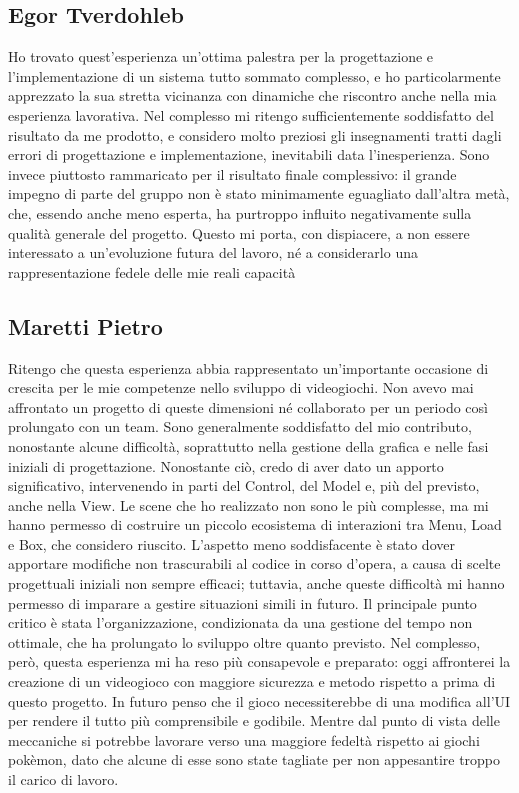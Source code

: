 \documentclass[a4paper,12pt]{report}
\begin{document}
{{\subsection{Egor Tverdohleb}
Ho trovato quest’esperienza un’ottima palestra per la progettazione e l’implementazione di un sistema tutto sommato complesso, e ho particolarmente apprezzato la sua stretta vicinanza con dinamiche che riscontro anche nella mia esperienza lavorativa. Nel complesso mi ritengo sufficientemente soddisfatto del risultato da me prodotto, e considero molto preziosi gli insegnamenti tratti dagli errori di progettazione e implementazione, inevitabili data l’inesperienza. Sono invece piuttosto rammaricato per il risultato finale complessivo: il grande impegno di parte del gruppo non è stato minimamente eguagliato dall’altra metà, che, essendo anche meno esperta, ha purtroppo influito negativamente sulla qualità generale del progetto. Questo mi porta, con dispiacere, a non essere interessato a un'evoluzione futura del lavoro, né a considerarlo una rappresentazione fedele delle mie reali capacità 

\subsection{Maretti Pietro}
Ritengo che questa esperienza abbia rappresentato un'importante occasione di crescita per le mie competenze nello sviluppo di videogiochi. Non avevo mai affrontato un progetto di queste dimensioni né collaborato per un periodo così prolungato con un team.
Sono generalmente soddisfatto del mio contributo, nonostante alcune difficoltà, soprattutto nella gestione della grafica e nelle fasi iniziali di progettazione. Nonostante ciò, credo di aver dato un apporto significativo, intervenendo in parti del Control, del Model e, più del previsto, anche nella View.
Le scene che ho realizzato non sono le più complesse, ma mi hanno permesso di costruire un piccolo ecosistema di interazioni tra Menu, Load e Box, che considero riuscito. L'aspetto meno soddisfacente è stato dover apportare modifiche non trascurabili al codice in corso d’opera, a causa di scelte progettuali iniziali non sempre efficaci; tuttavia, anche queste difficoltà mi hanno permesso di imparare a gestire situazioni simili in futuro.
Il principale punto critico è stata l’organizzazione, condizionata da una gestione del tempo non ottimale, che ha prolungato lo sviluppo oltre quanto previsto. Nel complesso, però, questa esperienza mi ha reso più consapevole e preparato: oggi affronterei la creazione di un videogioco con maggiore sicurezza e metodo rispetto a prima di questo progetto. In futuro penso che il gioco necessiterebbe di una modifica all'UI per rendere il tutto più comprensibile e godibile. Mentre dal punto di vista delle meccaniche si potrebbe lavorare verso una maggiore fedeltà rispetto ai giochi pokèmon, dato che alcune di esse sono state tagliate per non appesantire troppo il carico di lavoro.

}}
\end{document}
